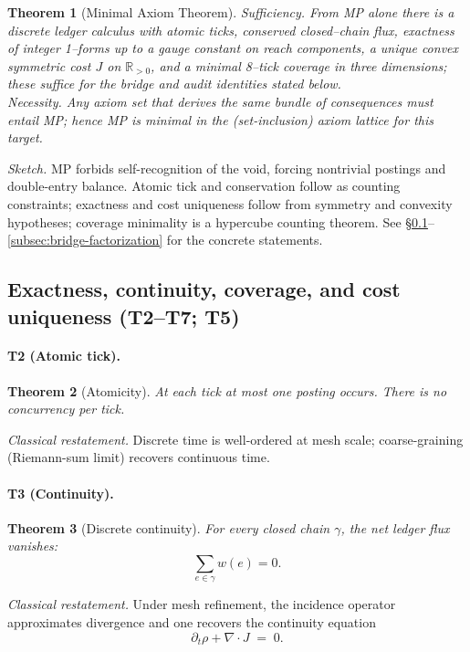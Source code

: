 \documentclass[11pt]{article}
\newtheorem{theorem}{Theorem}[section]
\begin{document}
\begin{theorem}[Minimal Axiom Theorem]\label{thm:MinimalAxiom}
\emph{Sufficiency.} From MP alone there is a discrete ledger calculus with atomic ticks, conserved closed--chain flux, exactness of integer 1--forms up to a gauge constant on reach components, a unique convex symmetric cost $J$ on $\mathbb{R}_{>0}$, and a minimal 8--tick coverage in three dimensions; these suffice for the bridge and audit identities stated below. \\
\emph{Necessity.} Any axiom set that derives the same bundle of consequences must entail MP; hence MP is minimal in the (set-inclusion) axiom lattice for this target.
\end{theorem}
\noindent\emph{Sketch.} MP forbids self-recognition of the void, forcing nontrivial postings and double-entry balance. Atomic tick and conservation follow as counting constraints; exactness and cost uniqueness follow from symmetry and convexity hypotheses; coverage minimality is a hypercube counting theorem. See \S\ref{subsec:exactness-continuity-coverage}--\ref{subsec:bridge-factorization} for the concrete statements.

\subsection{Exactness, continuity, coverage, and cost uniqueness (T2--T7; T5)}\label{subsec:exactness-continuity-coverage}

\paragraph{T2 (Atomic tick).}
\begin{theorem}[Atomicity]\label{thm:T2}
At each tick at most one posting occurs. There is no concurrency per tick.
\end{theorem}
\emph{Classical restatement.} Discrete time is well-ordered at mesh scale; coarse-graining (Riemann-sum limit) recovers continuous time.

\paragraph{T3 (Continuity).}
\begin{theorem}[Discrete continuity]\label{thm:T3}
For every closed chain $\gamma$, the net ledger flux vanishes:
\[
\sum_{e\in \gamma} w(e)=0.
\]
\end{theorem}
\emph{Classical restatement.} Under mesh refinement, the incidence operator approximates divergence and one recovers the continuity equation
\[
\partial_t \rho + \nabla\!\cdot\! J \;=\; 0.
\] 
\end{document}
